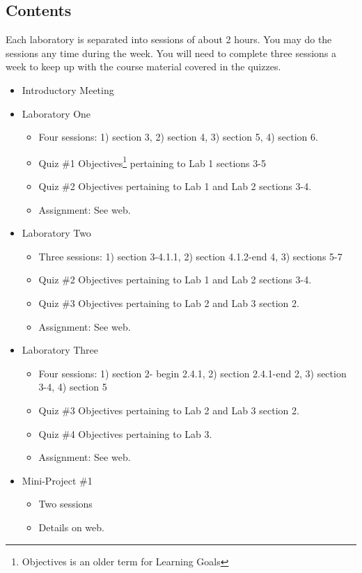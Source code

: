 \documentclass[10pt]{article}
\begin{document}
\subsection*{Contents}

Each laboratory is separated into sessions of about 2 hours.  You may do the 
sessions any time during the week.  You will need to complete three sessions
a week to keep up with the course material covered in the quizzes.

\begin{itemize}
\item Introductory Meeting
\item Laboratory One
\begin{itemize}
\item Four sessions: 1) section 3, 2) section 4, 3) section 5, 4) section 6.
\item Quiz \#1 Objectives\footnote{Objectives is an older term for Learning Goals} pertaining to Lab 1 sections 3-5
\item Quiz \#2 Objectives pertaining to Lab 1 and Lab 2 sections 3-4.
\item Assignment: See web.
\end{itemize}
\item Laboratory Two
\begin{itemize} 
\item Three sessions: 1) section 3-4.1.1, 2) section 4.1.2-end 4, 3) sections 5-7
\item Quiz \#2 Objectives pertaining to Lab 1 and Lab 2 sections 3-4.
\item Quiz \#3 Objectives pertaining to Lab 2 and Lab 3 section 2.
\item Assignment: See web.
\end{itemize} 
\item Laboratory Three
\begin{itemize}
\item Four sessions: 1) section 2- begin 2.4.1, 2) section 2.4.1-end 2, 3) section 3-4, 4) section 5
\item Quiz \#3 Objectives pertaining to Lab 2 and Lab 3 section 2.
\item Quiz \#4 Objectives pertaining to Lab 3.
\item Assignment: See web.
\end{itemize}
\item Mini-Project \#1
\begin{itemize}
\item Two sessions
\item Details on web.

\end{itemize}
\end{itemize}
\end{document}
